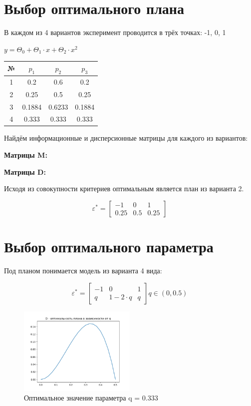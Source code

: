 \section{Выбор оптимального плана}

В каждом из 4 вариантов эксперимент проводится в трёх точках: -1, 0, 1

\( y = \Theta_0 + \Theta_1 \cdot x + \Theta_2 \cdot x^2 \)

\begin{tabular}{|c|c|c|c|}
\hline
	№ & $p_1$ & $p_2$ & $p_3$ \\ 
\hline
	1 & 0.2 & 0.6 & 0.2 \\ 
	2 & 0.25 & 0.5 & 0.25 \\ 
	3 & 0.1884 & 0.6233 & 0.1884 \\ 
	4 & 0.333 & 0.333 & 0.333 \\
\hline
\end{tabular}

Найдём информационные и дисперсионные матрицы для каждого из вариантов:

{\bf Матрицы M:}



{\bf Матрицы D:}





Исходя из совокупности критериев оптимальным является план из варианта 2.

\[
	\varepsilon^*= \begin{bmatrix}
	-1		&	0		&	1		\\
	0.25	&	0.5		&	0.25
	\end{bmatrix}
\] 


\section{Выбор оптимального параметра}

Под планом понимается модель из варианта 4 вида:

\[
	\varepsilon^*=
	\begin{bmatrix}
	    -1		& 		 0		 & 		1		\\
 	     q		& 1 - 2\cdot q &		q
	\end{bmatrix}
	q \in (0, 0.5)
\] 


\begin{figure}[!htb] %
	\centering
	\includegraphics[width=0.5\textwidth]{opt_q.png}
	\caption{Оптимальное значение параметра q = 0.333}
\end{figure}


